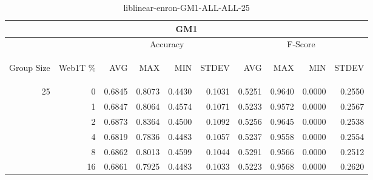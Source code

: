 \begin{center}
\begin{table}[htbp]
\begin{tabular}{ | r | r | r | r | r | r | r | r | r | r |}
\hline
\multicolumn{10}{|c|}{GM1}\\
\hline
 & & \multicolumn{4}{|c|}{Accuracy} & \multicolumn{4}{|c|}{F-Score}\\ \cline{3-10}
\begin{sideways}Group Size\end{sideways} & \begin{sideways}Web1T \%\end{sideways} & \begin{sideways}AVG\end{sideways} & \begin{sideways}MAX\end{sideways} & \begin{sideways}MIN\end{sideways} & \begin{sideways}STDEV\end{sideways} & \begin{sideways}AVG\end{sideways} & \begin{sideways}MAX\end{sideways} & \begin{sideways}MIN\end{sideways} & \begin{sideways}STDEV\end{sideways}\\
\hline
\multirow{5}{*}{25}
 & 0 & 0.6845 & 0.8073 & 0.4430 & 0.1031 & 0.5251 & 0.9640 & 0.0000 & 0.2550\\ \cline{2-10}
 & 1 & 0.6847 & 0.8064 & 0.4574 & 0.1071 & 0.5233 & 0.9572 & 0.0000 & 0.2567\\ \cline{2-10}
 & 2 & 0.6873 & 0.8364 & 0.4500 & 0.1092 & 0.5256 & 0.9645 & 0.0000 & 0.2538\\ \cline{2-10}
 & 4 & 0.6819 & 0.7836 & 0.4483 & 0.1057 & 0.5237 & 0.9558 & 0.0000 & 0.2554\\ \cline{2-10}
 & 8 & 0.6862 & 0.8013 & 0.4599 & 0.1044 & 0.5291 & 0.9566 & 0.0000 & 0.2512\\ \cline{2-10}
 & 16 & 0.6861 & 0.7925 & 0.4483 & 0.1033 & 0.5223 & 0.9568 & 0.0000 & 0.2620\\ \cline{2-10}
\hline
\end{tabular}
\caption{liblinear-enron-GM1-ALL-ALL-25}
\label{table:liblinear-enron-GM1-ALL-ALL-25}
\end{table}
\end{center}


